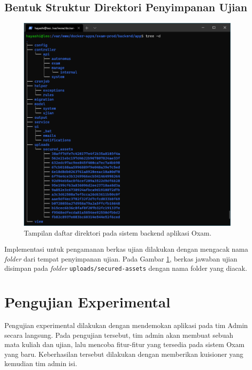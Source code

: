     \subsection{Bentuk Struktur Direktori Penyimpanan Ujian}
    \begin{figure}[htb]
        \centering
        \includegraphics[width=0.6\paperwidth]{Gambar/Screenshot 2021-01-16 014010.png}
        \caption{Tampilan daftar direktori pada sistem backend aplikasi Oxam.}
        \label{fig:dirlisting}
    \end{figure}
    Implementasi untuk pengamanan berkas ujian dilakukan dengan mengacak nama \textit{folder}
    dari tempat penyimpanan ujian. Pada Gambar \ref{fig:dirlisting}, berkas jawaban ujian disimpan pada
    \textit{folder} \texttt{uploads/secured-assets} dengan nama folder yang diacak.


\section{Pengujian Experimental}
    Pengujian experimental dilakukan dengan mendemokan aplikasi pada tim Admin secara langsung. Pada pengujian
    tersebut, tim admin akan membuat sebuah mata kuliah dan ujian, lalu mencoba fitur-fitur yang tersedia
    pada sistem Oxam yang baru. Keberhasilan tersebut dilakukan dengan memberikan kuisioner yang kemudian
    tim admin isi.
    
